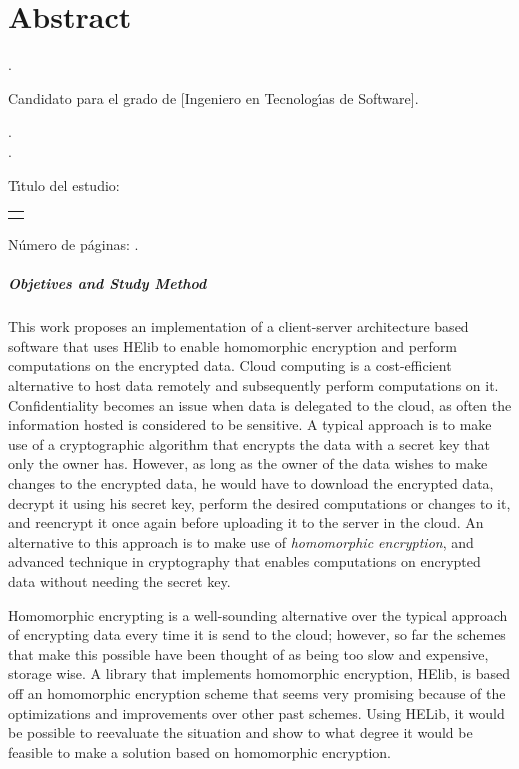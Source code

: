 \chapter{Abstract}

\noindent\autor.

\noindent Candidato para el grado de [Ingeniero en Tecnolog\'{\i}as de Software].

\noindent\uanl.\\
\noindent\fime.

\noindent T\'{\i}tulo del estudio: 

\begin{center}
\begin{tabular}{p{11cm}}
	\centering
	\scshape{\large{\titulo}}
\end{tabular}
\end{center}\bigskip

\noindent N\'{u}mero de p\'{a}ginas: \pageref*{lastpage}.

\paragraph{Objetives and Study Method}
This work proposes an implementation of a client-server architecture based software that uses HElib to enable homomorphic encryption and perform computations on the encrypted data. Cloud computing is a cost-efficient alternative to host data remotely and subsequently perform computations on it. Confidentiality becomes an issue when data is delegated to the cloud, as often the information hosted is considered to be sensitive. A typical approach is to make use of a cryptographic algorithm that encrypts the data with a secret key that only the owner has. However, as long as the owner of the data wishes to make changes to the encrypted data, he would have to download the encrypted data, decrypt it using his secret key, perform the desired computations or changes to it, and reencrypt it once again before uploading it to the server in the cloud. An alternative to this approach is to make use of \emph{homomorphic encryption}, and advanced technique in cryptography that enables computations on encrypted data without needing the secret key. 

Homomorphic encrypting is a well-sounding alternative over the typical approach of encrypting data every time it is send to the cloud; however, so far the schemes that make this possible have been thought of as being too slow and expensive, storage wise. A library that implements homomorphic encryption, HElib, is based off an homomorphic encryption scheme that seems very promising because of the optimizations and improvements over other past schemes. Using HELib, it would be possible to reevaluate the situation and show to what degree it would be feasible to make a solution based on homomorphic encryption.

